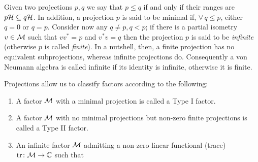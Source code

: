 Given two projections $p,q$ we say that $p\leq q$ if and only
if their ranges are $p\mathcal{H}\subseteq q\mathcal{H}$. In addition, a projection
$p$ is said to be minimal if, $\forall\,q\leq p$, either
$q=0$ or $q=p$. Consider now any $q\neq p, q<p$; if there is a partial
isometry $v\in\mathcal{M}$ such that $v v^*=p$ and $v^* v=q$ then the 
projection $p$ is said to be \emph{infinite} (otherwise $p$
is called \emph{finite}). In a nutshell, then, a finite projection
has no equivalent subprojections, whereas infinite projections
do. Consequently a von Neumann algebra is called infinite if its identity 
is infinite, otherwise it is finite.

\bigskip
 \begin{definition}
 Projections allow us to classify factors according
 to the following:
  \begin{enumerate}
  \item  A factor $\mathcal{M}$ with a minimal projection is called a
         Type I factor.
  \item  A factor $\mathcal{M}$ with no minimal projections but non-zero
         finite projections is called a Type II factor.
  \item  An infinite factor $\mathcal{M}$ admitting a non-zero linear
         functional (trace) $\operatorname{tr}\colon \mathcal{M}\to\mathbb{C}$ such that
         

\end{enumerate}
\end{definition}

